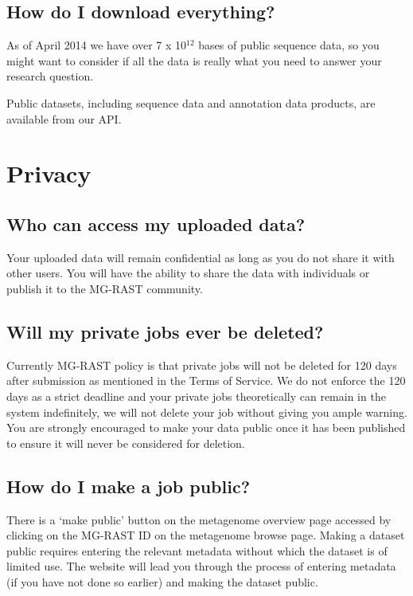 \documentclass[letterpaper,10pt,english]{sphinxmanual}
\begin{document}
\subsection{How do I download everything?}
\label{\detokenize{user_manual:how-do-i-download-everything}}
As of April 2014 we have over 7 x 10$^{\text{12}}$ bases of public sequence
data, so you might want to consider if all the data is really what you
need to answer your research question.

Public datasets, including sequence data and annotation data products,
are available from our API.


\section{Privacy}
\label{\detokenize{user_manual:privacy}}

\subsection{Who can access my uploaded data?}
\label{\detokenize{user_manual:who-can-access-my-uploaded-data}}
Your uploaded data will remain confidential as long as you do not share
it with other users. You will have the ability to share the data with
individuals or publish it to the MG-RAST community.


\subsection{Will my private jobs ever be deleted?}
\label{\detokenize{user_manual:will-my-private-jobs-ever-be-deleted}}
Currently MG-RAST policy is that private jobs will not be deleted for
120 days after submission as mentioned in the Terms of Service. We do
not enforce the 120 days as a strict deadline and your private jobs
theoretically can remain in the system indefinitely, we will not delete
your job without giving you ample warning. You are strongly encouraged
to make your data public once it has been published to ensure it will
never be considered for deletion.


\subsection{How do I make a job public?}
\label{\detokenize{user_manual:how-do-i-make-a-job-public}}
There is a ‘make public’ button on the metagenome overview page accessed
by clicking on the MG-RAST ID on the metagenome browse page. Making a
dataset public requires entering the relevant metadata without which the
dataset is of limited use. The website will lead you through the process
of entering metadata (if you have not done so earlier) and making the
dataset public.
\end{document}
